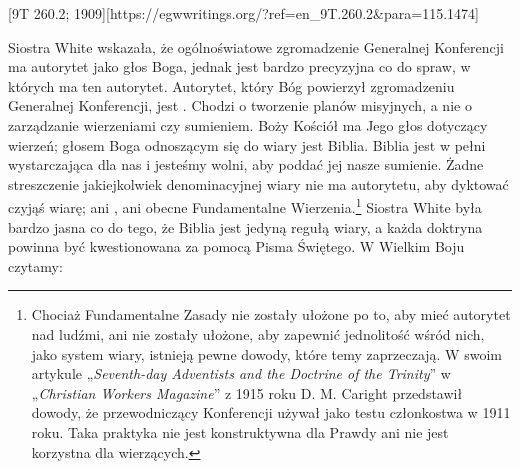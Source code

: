 [9T 260.2; 1909][https://egwwritings.org/?ref=en\_9T.260.2&para=115.1474]

Siostra White wskazała, że ogólnoświatowe zgromadzenie Generalnej Konferencji ma autorytet jako głos Boga, jednak jest bardzo precyzyjna co do spraw, w których ma ten autorytet. Autorytet, który Bóg powierzył zgromadzeniu Generalnej Konferencji, jest . Chodzi o tworzenie planów misyjnych, a nie o zarządzanie wierzeniami czy sumieniem. Boży Kościół ma Jego głos dotyczący wierzeń; głosem Boga odnoszącym się do wiary jest Biblia. Biblia jest w pełni wystarczająca dla nas i jesteśmy wolni, aby poddać jej nasze sumienie. Żadne streszczenie jakiejkolwiek denominacyjnej wiary nie ma autorytetu, aby dyktować czyjąś wiarę; ani , ani obecne Fundamentalne Wierzenia.\footnote{Chociaż Fundamentalne Zasady nie zostały ułożone po to, aby mieć autorytet nad ludźmi, ani nie zostały ułożone, aby zapewnić jednolitość wśród nich, jako system wiary, istnieją pewne dowody, które temy zaprzeczają. W swoim artykule „\textit{Seventh-day Adventists and the Doctrine of the Trinity}” w „\textit{Christian Workers Magazine}” z 1915 roku D. M. Caright przedstawił dowody, że przewodniczący Konferencji używał  jako testu członkostwa w 1911 roku. Taka praktyka nie jest konstruktywna dla Prawdy ani nie jest korzystna dla wierzących.} Siostra White była bardzo jasna co do tego, że Biblia jest jedyną regułą wiary, a każda doktryna powinna być kwestionowana za pomocą Pisma Świętego. W Wielkim Boju czytamy:

